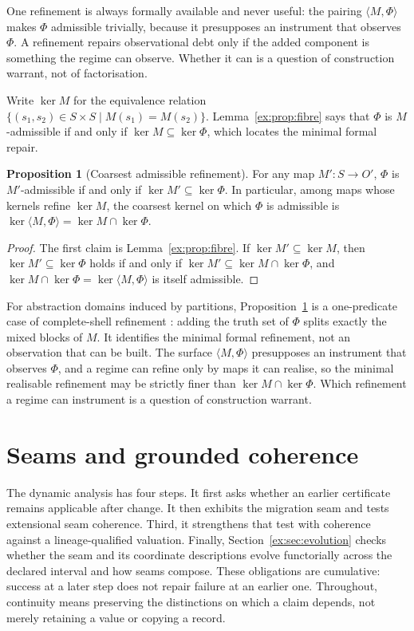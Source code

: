 \documentclass[11pt]{article}
\theoremstyle{definition}
\newtheorem{proposition}{Proposition}[section]
\begin{document}
One refinement is always formally available and never useful: the pairing $\langle M,\Phi \rangle$ makes $\Phi$ admissible trivially, because it presupposes an instrument that observes $\Phi$. A refinement repairs observational debt only if the added component is something the regime can observe. Whether it can is a question of construction warrant, not of factorisation.

Write $\ker M$ for the equivalence relation $\{(s_1,s_2)\in S\times S\mid M(s_1)=M(s_2)\}$. Lemma~\ref{ex:prop:fibre} says that $\Phi$ is $M$-admissible if and only if $\ker M \subseteq \ker \Phi$, which locates the minimal formal repair.

\begin{proposition}[Coarsest admissible refinement]\label{ex:prop:shell}
For any map $M':S\to O'$, $\Phi$ is $M'$-admissible if and only if $\ker M' \subseteq \ker \Phi$. In particular, among maps whose kernels refine $\ker M$, the coarsest kernel on which $\Phi$ is admissible is $\ker \langle M,\Phi \rangle=\ker M \cap \ker \Phi$.
\end{proposition}

\begin{proof}
The first claim is Lemma~\ref{ex:prop:fibre}. If $\ker M' \subseteq \ker M$, then $\ker M' \subseteq \ker \Phi$ holds if and only if $\ker M' \subseteq \ker M \cap \ker \Phi$, and $\ker M \cap \ker \Phi=\ker \langle M,\Phi \rangle$ is itself admissible.
\end{proof}

For abstraction domains induced by partitions, Proposition~\ref{ex:prop:shell} is a one-predicate case of complete-shell refinement \citep{giacobazziranzatoscozzari2000,ranzatotapparo2004}: adding the truth set of $\Phi$ splits exactly the mixed blocks of $M$. It identifies the minimal formal refinement, not an observation that can be built. The surface $\langle M,\Phi \rangle$ presupposes an instrument that observes $\Phi$, and a regime can refine only by maps it can realise, so the minimal realisable refinement may be strictly finer than $\ker M\cap\ker\Phi$. Which refinement a regime can instrument is a question of construction warrant.


\section{Seams and grounded coherence}\label{ex:sec:seams}\label{ch:change}

The dynamic analysis has four steps. It first asks whether an earlier certificate remains applicable after change. It then exhibits the migration seam and tests extensional seam coherence. Third, it strengthens that test with coherence against a lineage-qualified valuation. Finally, Section~\ref{ex:sec:evolution} checks whether the seam and its coordinate descriptions evolve functorially across the declared interval and how seams compose. These obligations are cumulative: success at a later step does not repair failure at an earlier one. Throughout, continuity means preserving the distinctions on which a claim depends, not merely retaining a value or copying a record.
\end{document}
